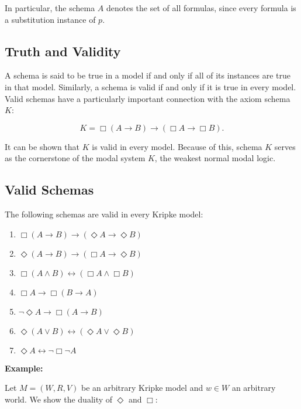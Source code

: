 \documentclass[12pt,a4paper,openany]{article}
\begin{document}
In particular, the schema $A$ denotes the set of all formulas, since every formula is a substitution instance of $p$.

\subsection{Truth and Validity}

A schema is said to be true in a model if and only if all of its instances are true in that model. Similarly, a schema is valid if and only if it is true in every model. Valid schemas have a particularly important connection with the axiom schema $K$:

$$K = \Box(A \to B) \to (\Box A \to \Box B).$$

It can be shown that $K$ is valid in every model. Because of this, schema $K$ serves as the cornerstone of the modal system $K$, the weakest normal modal logic.

\subsection{Valid Schemas}

The following schemas are valid in every Kripke model:

\begin{enumerate}
    \item $\Box(A \to B) \to (\Diamond A \to \Diamond B)$
    \item $\Diamond(A \to B) \to (\Box A \to \Diamond B)$
    \item $\Box(A \land B) \leftrightarrow (\Box A \land \Box B)$
    \item $\Box A \to \Box(B \to A)$
    \item $\neg \Diamond A \to \Box(A \to B)$
    \item $\Diamond(A \lor B) \leftrightarrow (\Diamond A \lor \Diamond B)$
    \item $\Diamond A \leftrightarrow \neg \Box \neg A$ 
\end{enumerate}

\newpage
\textbf{Example:}

Let $M = (W, R, V)$ be an arbitrary Kripke model and $w \in W$ an arbitrary world. We show the duality of $\Diamond$ and $\Box$:
\end{document}
